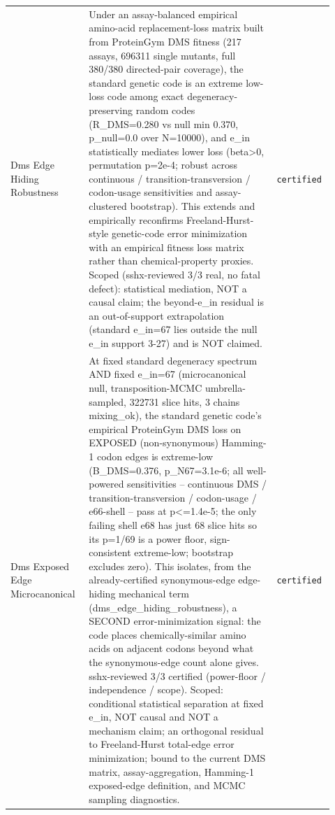 \begin{longtable}{>{\raggedright\arraybackslash}p{0.22\linewidth}>{\raggedright\arraybackslash}p{0.55\linewidth}>{\raggedright\arraybackslash}p{0.15\linewidth}}
Dms Edge Hiding Robustness & Under an assay-balanced empirical amino-acid replacement-loss matrix built from ProteinGym DMS fitness (217 assays, 696311 single mutants, full 380/380 directed-pair coverage), the standard genetic code is an extreme low-loss code among exact degeneracy-preserving random codes (R\_DMS=0.280 vs null min 0.370, p\_null=0.0 over N=10000), and e\_in statistically mediates lower loss (beta>0, permutation p=2e-4; robust across continuous / transition-transversion / codon-usage sensitivities and assay-clustered bootstrap). This extends and empirically reconfirms Freeland-Hurst-style genetic-code error minimization with an empirical fitness loss matrix rather than chemical-property proxies. Scoped (sshx-reviewed 3/3 real, no fatal defect): statistical mediation, NOT a causal claim; the beyond-e\_in residual is an out-of-support extrapolation (standard e\_in=67 lies outside the null e\_in support 3-27) and is NOT claimed. & \texttt{certified} \\
Dms Exposed Edge Microcanonical & At fixed standard degeneracy spectrum AND fixed e\_in=67 (microcanonical null, transposition-MCMC umbrella-sampled, 322731 slice hits, 3 chains mixing\_ok), the standard genetic code's empirical ProteinGym DMS loss on EXPOSED (non-synonymous) Hamming-1 codon edges is extreme-low (B\_DMS=0.376, p\_N67=3.1e-6; all well-powered sensitivities -- continuous DMS / transition-transversion / codon-usage / e66-shell -- pass at p<=1.4e-5; the only failing shell e68 has just 68 slice hits so its p=1/69 is a power floor, sign-consistent extreme-low; bootstrap excludes zero). This isolates, from the already-certified synonymous-edge edge-hiding mechanical term (dms\_edge\_hiding\_robustness), a SECOND error-minimization signal: the code places chemically-similar amino acids on adjacent codons beyond what the synonymous-edge count alone gives. sshx-reviewed 3/3 certified (power-floor / independence / scope). Scoped: conditional statistical separation at fixed e\_in, NOT causal and NOT a mechanism claim; an orthogonal residual to Freeland-Hurst total-edge error minimization; bound to the current DMS matrix, assay-aggregation, Hamming-1 exposed-edge definition, and MCMC sampling diagnostics. & \texttt{certified} \\

\end{longtable}
